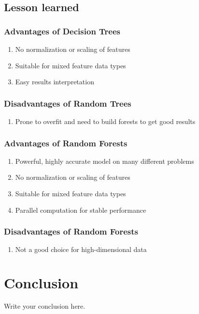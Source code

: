 \documentclass{article}
\begin{document}
\subsection{Lesson learned}
\subsubsection{Advantages of Decision Trees}
\begin{enumerate}
	\item No normalization or scaling of features
	\item Suitable for mixed feature data types
	\item Easy results interpretation
\end{enumerate}

\subsubsection{Disadvantages of Random Trees}
\begin{enumerate}
\item Prone to overfit and need to build forests to get good results
\end{enumerate}

\subsubsection{Advantages of Random Forests}
\begin{enumerate}
	\item Powerful, highly accurate model on many different problems
	\item No normalization or scaling of features
	\item Suitable for mixed feature data types
	\item Parallel computation for stable performance
\end{enumerate}

\subsubsection{Disadvantages of Random Forests}
\begin{enumerate}
	\item Not a good choice for high-dimensional data
\end{enumerate}

\section{Conclusion}
Write your conclusion here.
\end{document}
